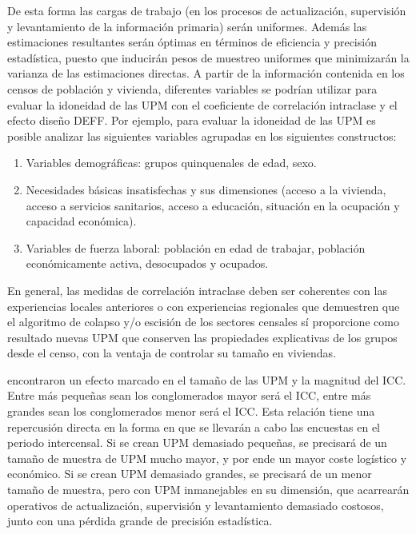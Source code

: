 \documentclass[
  12pt,
  spanish,
]{book}
\providecommand{\tightlist}{%
  \setlength{\itemsep}{0pt}\setlength{\parskip}{0pt}}
\begin{document}
De esta forma las cargas de trabajo (en los procesos de actualización, supervisión y levantamiento de la información primaria) serán uniformes. Además las estimaciones resultantes serán óptimas en términos de eficiencia y precisión estadística, puesto que inducirán pesos de muestreo uniformes que minimizarán la varianza de las estimaciones directas. A partir de la información contenida en los censos de población y vivienda, diferentes variables se podrían utilizar para evaluar la idoneidad de las UPM con el coeficiente de correlación intraclase y el efecto diseño DEFF. Por ejemplo, para evaluar la idoneidad de las UPM es posible analizar las siguientes variables agrupadas en los siguientes constructos:

\begin{enumerate}
\def\labelenumi{\arabic{enumi}.}
\tightlist
\item
  Variables demográficas: grupos quinquenales de edad, sexo.
\item
  Necesidades básicas insatisfechas y sus dimensiones (acceso a la vivienda, acceso a servicios sanitarios, acceso a educación, situación en la ocupación y capacidad económica).
\item
  Variables de fuerza laboral: población en edad de trabajar, población económicamente activa, desocupados y ocupados.
\end{enumerate}

En general, las medidas de correlación intraclase deben ser coherentes con las experiencias locales anteriores o con experiencias regionales que demuestren que el algoritmo de colapso y/o escisión de los sectores censales sí proporcione como resultado nuevas UPM que conserven las propiedades explicativas de los grupos desde el censo, con la ventaja de controlar su tamaño en viviendas.

\citet{hansen1953sample} encontraron un efecto marcado en el tamaño de las UPM y la magnitud del ICC. Entre más pequeñas sean los conglomerados mayor será el ICC, entre más grandes sean los conglomerados menor será el ICC. Esta relación tiene una repercusión directa en la forma en que se llevarán a cabo las encuestas en el periodo intercensal. Si se crean UPM demasiado pequeñas, se precisará de un tamaño de muestra de UPM mucho mayor, y por ende un mayor coste logístico y económico. Si se crean UPM demasiado grandes, se precisará de un menor tamaño de muestra, pero con UPM inmanejables en su dimensión, que acarrearán operativos de actualización, supervisión y levantamiento demasiado costosos, junto con una pérdida grande de precisión estadística.
\end{document}

